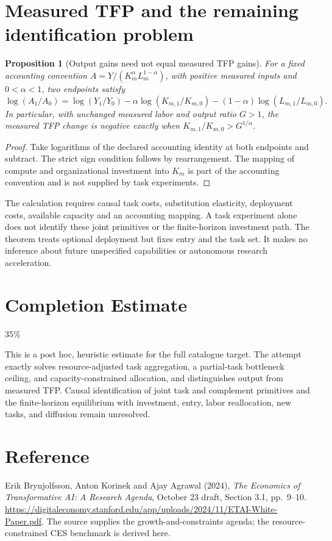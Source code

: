 \documentclass[11pt,a4paper]{article}
\newtheorem{proposition}[theorem]{Proposition}
\theoremstyle{definition}
\theoremstyle{remark}
\begin{document}
\section{Measured TFP and the remaining identification problem}
\begin{proposition}[Output gains need not equal measured TFP gains]
For a fixed accounting convention $A=Y/(K_m^\alpha L_m^{1-\alpha})$, with positive measured inputs and $0<\alpha<1$, two endpoints satisfy
\[
 \log(A_1/A_0)=\log(Y_1/Y_0)
 -\alpha\log(K_{m,1}/K_{m,0})-(1-\alpha)\log(L_{m,1}/L_{m,0}).
\]
In particular, with unchanged measured labor and output ratio $G>1$, the measured TFP change is negative exactly when $K_{m,1}/K_{m,0}>G^{1/\alpha}$.
\end{proposition}
\begin{proof}
Take logarithms of the declared accounting identity at both endpoints and subtract. The strict sign condition follows by rearrangement. The mapping of compute and organizational investment into $K_m$ is part of the accounting convention and is not supplied by task experiments.
\end{proof}

The calculation requires causal task costs, substitution elasticity, deployment costs, available capacity and an accounting mapping. A task experiment alone does not identify these joint primitives or the finite-horizon investment path. The theorem treats optional deployment but fixes entry and the task set. It makes no inference about future unspecified capabilities or autonomous research acceleration.

\section{Completion Estimate}
35\%

This is a post hoc, heuristic estimate for the full catalogue target.
The attempt exactly solves resource-adjusted task aggregation, a partial-task bottleneck ceiling, and capacity-constrained allocation, and distinguishes output from measured TFP. Causal identification of joint task and complement primitives and the finite-horizon equilibrium with investment, entry, labor reallocation, new tasks, and diffusion remain unresolved.

\section{Reference}
Erik Brynjolfsson, Anton Korinek and Ajay Agrawal (2024), \emph{The Economics of Transformative AI: A Research Agenda}, October 23 draft, Section 3.1, pp.~9--10. \url{https://digitaleconomy.stanford.edu/app/uploads/2024/11/ETAI-White-Paper.pdf}. The source supplies the growth-and-constraints agenda; the resource-constrained CES benchmark is derived here.
\end{document}
